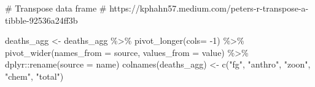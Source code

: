 \documentclass[
  letterpaper,
  DIV=11,
  numbers=noendperiod]{scrartcl}
\newenvironment{Shaded}{\begin{snugshade}}{\end{snugshade}}
\newcommand{\AttributeTok}[1]{\textcolor[rgb]{0.40,0.45,0.13}{#1}}
\newcommand{\CommentTok}[1]{\textcolor[rgb]{0.37,0.37,0.37}{#1}}
\newcommand{\DecValTok}[1]{\textcolor[rgb]{0.68,0.00,0.00}{#1}}
\newcommand{\FunctionTok}[1]{\textcolor[rgb]{0.28,0.35,0.67}{#1}}
\newcommand{\NormalTok}[1]{\textcolor[rgb]{0.00,0.23,0.31}{#1}}
\newcommand{\OtherTok}[1]{\textcolor[rgb]{0.00,0.23,0.31}{#1}}
\newcommand{\SpecialCharTok}[1]{\textcolor[rgb]{0.37,0.37,0.37}{#1}}
\newcommand{\StringTok}[1]{\textcolor[rgb]{0.13,0.47,0.30}{#1}}
\begin{document}
\begin{Shaded}
\begin{Highlighting}[]
\CommentTok{\# Transpose data frame}
\CommentTok{\# https://kphahn57.medium.com/peters{-}r{-}transpose{-}a{-}tibble{-}92536a24ff3b}

\NormalTok{deaths\_agg }\OtherTok{\textless{}{-}}\NormalTok{ deaths\_agg }\SpecialCharTok{\%\textgreater{}\%} \FunctionTok{pivot\_longer}\NormalTok{(}\AttributeTok{cols=} \SpecialCharTok{{-}}\DecValTok{1}\NormalTok{) }\SpecialCharTok{\%\textgreater{}\%} \FunctionTok{pivot\_wider}\NormalTok{(}\AttributeTok{names\_from =}\NormalTok{ source, }\AttributeTok{values\_from =}\NormalTok{ value) }\SpecialCharTok{\%\textgreater{}\%}\NormalTok{ dplyr}\SpecialCharTok{::}\FunctionTok{rename}\NormalTok{(}\AttributeTok{source =}\NormalTok{ name)}
\FunctionTok{colnames}\NormalTok{(deaths\_agg) }\OtherTok{\textless{}{-}} \FunctionTok{c}\NormalTok{(}\StringTok{"fg"}\NormalTok{, }\StringTok{"anthro"}\NormalTok{, }\StringTok{"zoon"}\NormalTok{, }\StringTok{"chem"}\NormalTok{, }\StringTok{"total"}\NormalTok{)}
\end{Highlighting}
\end{Shaded}
\end{document}
